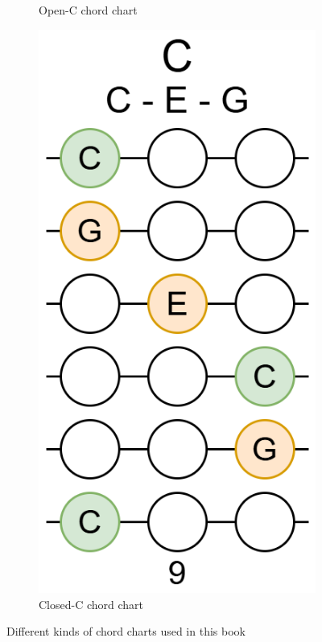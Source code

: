 \begin{figure}[h]
\begin{subfigure}[b]{0.45\textwidth}
		\caption{Open-C chord chart}
		\label{fig:open_chord_chart_example}
	\end{subfigure}
	\hfill
	\begin{subfigure}[b]{0.45\textwidth}
		\centering
		\includegraphics[height=0.3\textheight]{../../Images/ClosedCChordChart.png}
		\caption{Closed-C chord chart}
		\label{fig:closed_chord_chart_example}
	\end{subfigure}
	\caption{Different kinds of chord charts used in this book}
	\label{fig:kinds_of_chord_charts_in_the_book}
\end{figure}